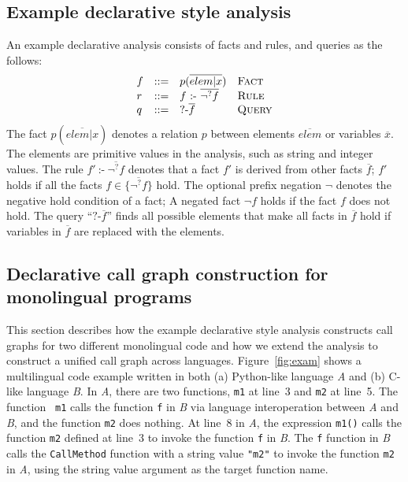 \subsection{Example declarative style analysis}
An example declarative analysis consists of facts and rules, and queries as the
follows:
\[
  \begin{array}{llll}
    f & ::= & p(\overline{elem | x}) & \text{\sc Fact}\\
    r & ::= & f\ \mbox{:-}\ \overline{\neg^? f} & \text{\sc Rule}\\
    q & ::= & \mbox{?-} \overline{f}\ &  \text{\sc Query}
\end{array}
\]
The fact $p(\overline{elem | x})$ denotes a relation $p$ between elements
$\overline{elem}$ or variables $\overline{x}$. The elements are primitive
values in the analysis, such as string and integer values.  The rule $f'\
\mbox{:-}\ \overline{\neg^? f}$ denotes that a fact $f'$ is derived from other
facts $\overline{f}$; $f'$ holds if all the facts $f \in \{\overline{\neg^?
f}\}$ hold. The optional prefix negation $\neg$ denotes the negative hold
condition of a fact; A negated fact $\neg f$ holds if the fact $f$ does not
hold. The query ``$\mbox{?-} \overline{f}$'' finds all possible elements that
make all facts in $\overline{f}$ hold if variables in $\overline{f}$ are
replaced with the elements.


\subsection{Declarative call graph construction for monolingual programs}\label{lab:ovmono}

\lstset{
  basicstyle=\ttfamily,
  columns=fullflexible,
  keepspaces=true,
  mathescape
}

This section describes how the example declarative style analysis constructs call graphs
for two different monolingual code and how we extend the analysis to construct
a unified call graph across languages.
Figure~\ref{fig:exam} shows a multilingual code example written in both (a)
Python-like language {\it A} and (b) C-like language {\it B}. In {\it A}, there
are two functions, {\tt m1} at line~3 and {\tt m2} at line~5. The function {\tt
m1} calls the function {\tt f} in {\it B} via language interoperation between
{\it A} and {\it B}, and the function {\tt m2} does nothing. At line~8 in {\it
A}, the expression {\tt m1()} calls the function {\tt m2} defined at line~3 to
invoke the function {\tt f} in {\it B}.
The {\tt f} function in {\it B} calls the {\tt CallMethod} function with a
string value {\tt "m2"} to invoke the function {\tt m2} in {\it A}, using the
string value argument as the target function name.


